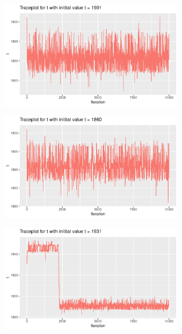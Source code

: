 \begin{figure}[h]
    \centering
    \begin{subfigure}[b]{0.49\textwidth}
        \centering
        \includegraphics[width = \textwidth]{Images/sim_t_1_1.pdf}
        \label{fig:sim_t_diff_start_35}
    \end{subfigure}
    \begin{subfigure}[b]{0.49\textwidth}
        \centering
        \includegraphics[width = \textwidth]{Images/sim_t_1_2.pdf}
        \label{fig:sim_t_diff_start_45}
    \end{subfigure}
    \begin{subfigure}[b]{0.49\textwidth}
        \centering
        \includegraphics[width = \textwidth]{Images/sim_t_1_3.pdf}

\end{subfigure}
\end{figure}
